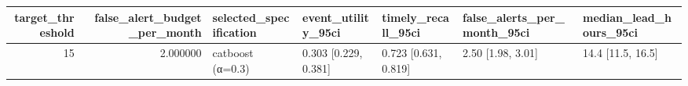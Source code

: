 \begin{tabular}{rrlllll}
\toprule
target\_threshold & false\_alert\_budget\_per\_month & selected\_specification & event\_utility\_95ci & timely\_recall\_95ci & false\_alerts\_per\_month\_95ci & median\_lead\_hours\_95ci \\
\midrule
15 & 2.000000 & catboost (α=0.3) & 0.303 [0.229, 0.381] & 0.723 [0.631, 0.819] & 2.50 [1.98, 3.01] & 14.4 [11.5, 16.5] \\
\bottomrule
\end{tabular}
